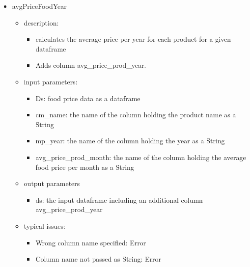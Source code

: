 \documentclass[12pt,a4paper,english]{article}
\begin{document}
\begin{itemize}
\item avgPriceFoodYear
	\begin{itemize}
	\item description: 
		\begin{itemize}
		\item calculates the average price per year for each product for a given dataframe 
		\item Adds column avg\_price\_prod\_year.
		\end{itemize}
	\item input parameters: 
		\begin{itemize}
		\item Ds: food price data as a dataframe 
		\item cm\_name: the name of the column holding the product name as a String        
		\item mp\_year: the name of the column holding the year as a String      
		\item avg\_price\_prod\_month: the name of the column holding the average food price per month as a String 
		\end{itemize}
	\item output parameters
		\begin{itemize}
		\item ds: the input dataframe including an additional column avg\_price\_prod\_year
		\end{itemize}
	\item typical issues:
		\begin{itemize}
		\item Wrong column name specified: Error
		\item Column name not passed as String: Error
		\end{itemize}
	\end{itemize}


\end{itemize}
\end{document}
